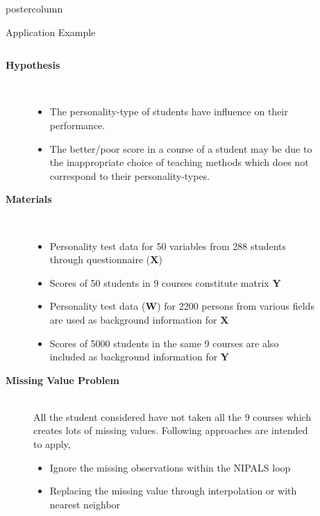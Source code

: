 \documentclass[9pt, final]{beamer}\usepackage[]{graphicx}\usepackage[]{color}
\begin{document}
\begin{frame}[fragile]
\begin{columns}
\begin{column}{\textwidth}
\begin{beamercolorbox}[center, wd=\textwidth]{postercolumn}
\begin{minipage}[T]{0.98\textwidth}
{      %
\begin{block}{Application Example}
\begin{columns}[T, onlytextwidth]
\begin{column}{0.34\textwidth}
\begin{description}
\item[\textbf{Hypothesis}]\hfill\\
	\begin{itemize}
		\item The personality-type of students have influence on their performance. 
		\item The better/poor score in a course of a student may be due to the inappropriate choice of teaching methods which does not correspond to their personality-types.
	\end{itemize}
	\vspace{1cm}
\item[\textbf{Materials}]\hfill\\
	\begin{itemize}
		\item Personality test data for 50 variables from 288 students through questionnaire (\textbf{X})
		\item Scores of 50 students in 9 courses constitute matrix \textbf{Y}
		\item Personality test data (\textbf{W}) for 2200 persons from various fields are used as background information for \textbf{X}
		\item Scores of 5000 students in the same 9 courses are also included as background information for \textbf{Y}
	\end{itemize}
	\vspace{1cm}
\item[\textbf{Missing Value Problem}]\hfill\\
	All the student considered have not taken all the 9 courses which creates lots of missing values. Following approaches are intended to apply,
	\begin{itemize}
		\item Ignore the missing observations within the NIPALS loop
		\item Replacing the missing value through interpolation or with nearest neighbor
	\end{itemize}
\end{description}
\end{column}
\begin{column}{0.62\textwidth}
\begin{figure}

\end{figure}
\end{column}
\end{columns}
\end{block}}
\end{minipage}
\end{beamercolorbox}
\end{column}
\end{columns}
\end{frame}
\end{document}
